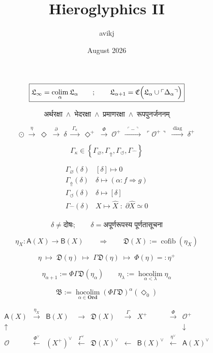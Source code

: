 \documentclass{article}
\title{Hieroglyphics II}
\author{avikj}
\date{August 2026}
\begin{document}
\maketitle

\[
\boxed{
\mathfrak L_{\infty}
=
\operatorname*{colim}_{\alpha}
\mathfrak L_{\alpha}
\qquad ; \qquad
\mathfrak L_{\alpha+1}
=
\mathfrak C
\Bigl(
\mathfrak L_{\alpha}
\cup
\ulcorner
\Delta_{\alpha}
\urcorner
\Bigr)
}
\]

\[
\boxed{
\text{अर्थरक्षा}
\;\wedge\;
\text{भेदरक्षा}
\;\wedge\;
\text{प्रमाणरक्षा}
\;\wedge\;
\text{रूपपुनर्जननम्}
}
\]

\[
\odot
\;\xrightarrow{\;\eta\;}\;
\Diamond
\;\xrightarrow{\;\partial\;}\;
\delta
\;\xrightarrow{\;\Gamma_{\kappa}\;}\;
\Diamond^{+}
\;\xrightarrow{\;\Phi\;}\;
\mathcal O^{+}
\;\xrightarrow{\;\ulcorner-\urcorner\;}\;
\ulcorner\mathcal O^{+}\urcorner
\;\xrightarrow{\;\operatorname{diag}\;}\;
\delta^{+}
\]

\[
\boxed{
\Gamma_{\kappa}
\in
\left\{
\Gamma_{\varnothing},
\Gamma_{\Uparrow},
\Gamma_{\circlearrowleft},
\Gamma_{\widehat{\phantom X}}
\right\}
}
\]

\[
\begin{array}{c|c}
\Gamma_{\varnothing}(\delta)
&
[\delta]\mapsto0
\\[1mm]
\Gamma_{\Uparrow}(\delta)
&
\delta\mapsto
\left(
\alpha:
f\Rightarrow g
\right)
\\[1mm]
\Gamma_{\circlearrowleft}(\delta)
&
\delta\mapsto[\delta]
\\[1mm]
\Gamma_{\widehat{\phantom X}}(\delta)
&
X\mapsto\widehat X
\;:\;
\partial\widehat X\simeq0
\end{array}
\]

\[
\boxed{
\delta
\neq
\text{दोषः};
\qquad
\delta
=
\text{अपूर्णरूपस्य पूर्णतासूचना}
}
\]

\[
\eta_X:
\mathsf A(X)\longrightarrow\mathsf B(X)
\qquad
\Longrightarrow
\qquad
\mathfrak D(X)
:=
\operatorname{cofib}(\eta_X)
\]

\[
\boxed{
\eta
\;\longmapsto\;
\mathfrak D(\eta)
\;\longmapsto\;
\Gamma\mathfrak D(\eta)
\;\longmapsto\;
\Phi(\eta)
=:
\eta^{+}
}
\]

\[
\eta_{\alpha+1}
:=
\Phi
\Gamma
\mathfrak D
(\eta_{\alpha})
\qquad
\eta_{\lambda}
:=
\operatorname*{hocolim}_{\alpha<\lambda}
\eta_{\alpha}
\]

\[
\boxed{
\mathfrak B
:=
\operatorname*{hocolim}_{\alpha\in\mathbf{Ord}}
\left(
\Phi\Gamma\mathfrak D
\right)^{\alpha}
(\Diamond_0)
}
\]

\[
\begin{array}{ccccccccc}
\mathsf A(X)
&\xrightarrow{\eta_X}&
\mathsf B(X)
&\longrightarrow&
\mathfrak D(X)
&\xrightarrow{\Gamma}&
X^{+}
&\xrightarrow{\Phi}&
\mathcal O^{+}
\\
\uparrow&&&&&&&&\downarrow
\\
\mathcal O
&\xleftarrow{\Phi^\vee}&
(X^{+})^\vee
&\xleftarrow{\Gamma^\vee}&
\mathfrak D(X)^\vee
&\xleftarrow{}&
\mathsf B(X)^\vee
&\xleftarrow{\eta^\vee}&
\mathsf A(X)^\vee
\end{array}
\]
\end{document}
